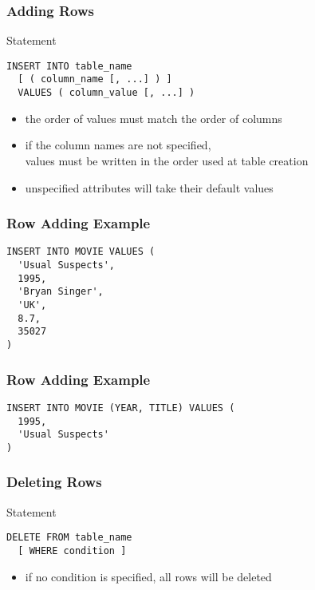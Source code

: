 \documentclass[dvipsnames]{beamer}
\theoremstyle{plain}
\begin{document}
\begin{frame}[fragile]
  \frametitle{Adding Rows}

  \begin{block}{Statement}
    \begin{lstlisting}
INSERT INTO table_name
  [ ( column_name [, ...] ) ]
  VALUES ( column_value [, ...] )
    \end{lstlisting}
  \end{block}

  \pause
  \begin{itemize}
    \item the order of values must match the order of columns
    \item if the column names are not specified,\\
      values must be written in the order used at table creation
    \item unspecified attributes will take their default values
  \end{itemize}
\end{frame}

\begin{frame}[fragile]
  \frametitle{Row Adding Example}

  \begin{example}
    \begin{lstlisting}
INSERT INTO MOVIE VALUES (
  'Usual Suspects',
  1995,
  'Bryan Singer',
  'UK',
  8.7,
  35027
)
    \end{lstlisting}
  \end{example}
\end{frame}

\begin{frame}[fragile]
  \frametitle{Row Adding Example}

  \begin{example}
    \begin{lstlisting}
INSERT INTO MOVIE (YEAR, TITLE) VALUES (
  1995,
  'Usual Suspects'
)
    \end{lstlisting}
  \end{example}
\end{frame}

\begin{frame}[fragile]
  \frametitle{Deleting Rows}

  \begin{block}{Statement}
    \begin{lstlisting}
DELETE FROM table_name
  [ WHERE condition ]
    \end{lstlisting}
  \end{block}

  \pause
  \begin{itemize}
    \item if no condition is specified, all rows will be deleted
  \end{itemize}
\end{frame}
\end{document}
